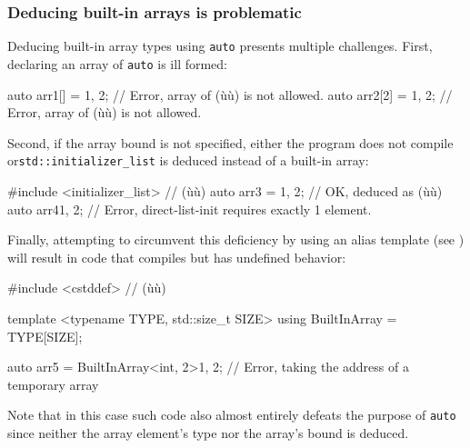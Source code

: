 \subsubsection[Deducing built-in arrays is problematic]{Deducing built-in arrays is problematic}\label{deducing-built-in-arrays-is-problematic}

Deducing built-in array types using \lstinline!auto! presents multiple
challenges. First, declaring an array of \lstinline!auto! is ill formed:

\begin{emcppslisting}
auto arr1[]  = {1, 2};  // Error, array of (ù{}ù) is not allowed.
auto arr2[2] = {1, 2};  // Error, array of (ù{}ù) is not allowed.
\end{emcppslisting}
    
\noindent Second, if the array bound is not specified, either the program does not
compile or\linebreak[4]%
 \lstinline!std::initializer_list! is deduced instead of a
built-in array:

\begin{emcppslisting}
#include <initializer_list>  // (ù{}ù)
auto arr3 = {1, 2};  // OK, deduced as (ù{}ù)
auto arr4{1, 2};     // Error, direct-list-init requires exactly 1 element.
\end{emcppslisting}
    
\noindent Finally, attempting to circumvent this deficiency by using an alias
template (see ) will result in code that
compiles but has undefined behavior:

\begin{emcppshiddenlisting}[emcppsbatch=e21]
#include <cstddef>  // (ù{}ù)
\end{emcppshiddenlisting}
\begin{emcppslisting}[emcppsbatch=e21]
template <typename TYPE, std::size_t SIZE>
using BuiltInArray = TYPE[SIZE];

auto arr5 = BuiltInArray<int, 2>{1, 2};
    // Error, taking the address of a temporary array
\end{emcppslisting}
    
\noindent Note that in this case such code also almost entirely defeats the
purpose of \lstinline!auto! since neither the array element's type nor the
array's bound is deduced.

